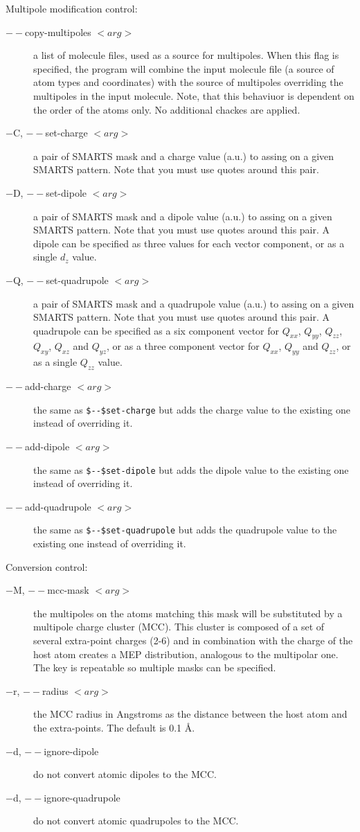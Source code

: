 \documentclass[10pt,a4paper]{article}
\begin{document}
Multipole modification control:
\begin{description}
\item[$--$copy-multipoles $<arg>$] a list of molecule files, used as a source for 
multipoles. When this flag is specified, the program will combine the input molecule file
(a source of atom types and coordinates) with the source of multipoles overriding the 
multipoles in the input molecule. Note, that this behaviuor is dependent on the order of 
the atoms only. No additional chackes are applied.
\item[$-$C, $--$set-charge $<arg>$] a pair of SMARTS mask and a charge value (a.u.) 
to assing on a given SMARTS pattern. Note that you must use quotes around this pair.
\item[$-$D, $--$set-dipole $<arg>$] a pair of SMARTS mask and a dipole value (a.u.)
to assing on a given SMARTS pattern. Note that you must use quotes around this pair. 
A dipole can be specified as three values for each vector component, 
or as a single $d_{z}$ value.
\item[$-$Q, $--$set-quadrupole $<arg>$] a pair of SMARTS mask and a quadrupole value (a.u.)
to assing on a given SMARTS pattern. Note that you must use quotes around this pair. 
A quadrupole can be specified as a six component vector for $Q_{xx}$, $Q_{yy}$, $Q_{zz}$,
$Q_{xy}$, $Q_{xz}$ and $Q_{yz}$, or as a three component vector for 
$Q_{xx}$, $Q_{yy}$ and $Q_{zz}$, or as a single $Q_{zz}$ value.
\item[$--$add-charge $<arg>$] the same as \lstinline{$--$set-charge} but adds the charge
value to the existing one instead of overriding it.
\item[$--$add-dipole $<arg>$] the same as \lstinline{$--$set-dipole} but adds the dipole
value to the existing one instead of overriding it.
\item[$--$add-quadrupole $<arg>$] the same as \lstinline{$--$set-quadrupole} but adds the 
quadrupole value to the existing one instead of overriding it.
\end{description}

Conversion control:

\begin{description}
\item[$-$M, $--$mcc-mask $<arg>$] the multipoles on the atoms matching this mask will 
be substituted
by a multipole charge cluster (MCC). This cluster is composed of a set of several 
extra-point charges (2-6) and in combination with the charge of the host atom creates 
a MEP distribution, analogous to the multipolar one. The key is repeatable so multiple 
masks can be specified.
\item[$-$r, $--$radius $<arg>$] the MCC radius in Angstroms as the distance between 
the host atom and the extra-points. The default is 0.1 \AA.
\item[$-$d, $--$ignore-dipole] do not convert atomic dipoles to the MCC.
\item[$-$d, $--$ignore-quadrupole] do not convert atomic quadrupoles to the MCC.
\end{description}
\end{document}
